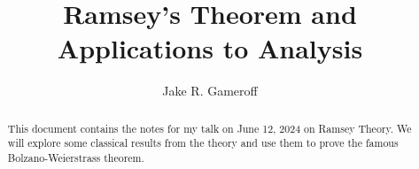 
\makeatletter
\def\@settitle{\begin{center}%
  \baselineskip14\p@\relax
    \normalfont\Large%
\@title
  \end{center}%
}
\makeatother

\title{Ramsey's Theorem and Applications to Analysis}
\author{Jake R. Gameroff}
\usepackage{hyperref}

\begin{abstract}
This document contains the notes for my talk on June 12, 2024 on Ramsey Theory. We will explore some classical results from the theory and use them to prove the famous Bolzano-Weierstrass theorem.
\end{abstract}
\maketitle




 

